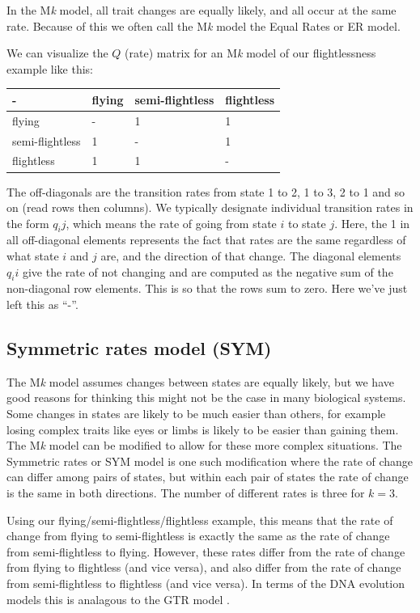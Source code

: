 \documentclass[]{book}
\begin{document}
In the M\emph{k} model, all trait changes are equally likely, and all
occur at the same rate. Because of this we often call the M\emph{k}
model the Equal Rates or ER model.

We can visualize the \(Q\) (rate) matrix for an M\emph{k} model of our
flightlessness example like this:

\begin{longtable}[]{@{}llll@{}}
\toprule
- & flying & semi-flightless & flightless\tabularnewline
\midrule
\endhead
flying & - & 1 & 1\tabularnewline
semi-flightless & 1 & - & 1\tabularnewline
flightless & 1 & 1 & -\tabularnewline
\bottomrule
\end{longtable}

The off-diagonals are the transition rates from state 1 to 2, 1 to 3, 2
to 1 and so on (read rows then columns). We typically designate
individual transition rates in the form \(q_ij\), which means the rate
of going from state \(i\) to state \(j\). Here, the 1 in all
off-diagonal elements represents the fact that rates are the same
regardless of what state \(i\) and \(j\) are, and the direction of that
change. The diagonal elements \(q_ii\) give the rate of not changing and
are computed as the negative sum of the non-diagonal row elements. This
is so that the rows sum to zero. Here we've just left this as ``-''.

\subsection{Symmetric rates model
(SYM)}\label{symmetric-rates-model-sym}

The M\emph{k} model assumes changes between states are equally likely,
but we have good reasons for thinking this might not be the case in many
biological systems. Some changes in states are likely to be much easier
than others, for example losing complex traits like eyes or limbs is
likely to be easier than gaining them. The M\emph{k} model can be
modified to allow for these more complex situations. The Symmetric rates
or SYM model \citep{paradis2004ape} is one such modification where the
rate of change can differ among pairs of states, but within each pair of
states the rate of change is the same in both directions. The number of
different rates is three for \(k = 3\).

Using our flying/semi-flightless/flightless example, this means that the
rate of change from flying to semi-flightless is exactly the same as the
rate of change from semi-flightless to flying. However, these rates
differ from the rate of change from flying to flightless (and vice
versa), and also differ from the rate of change from semi-flightless to
flightless (and vice versa). In terms of the DNA evolution models this
is analagous to the GTR model \citep{lanave1984new}.
\end{document}

